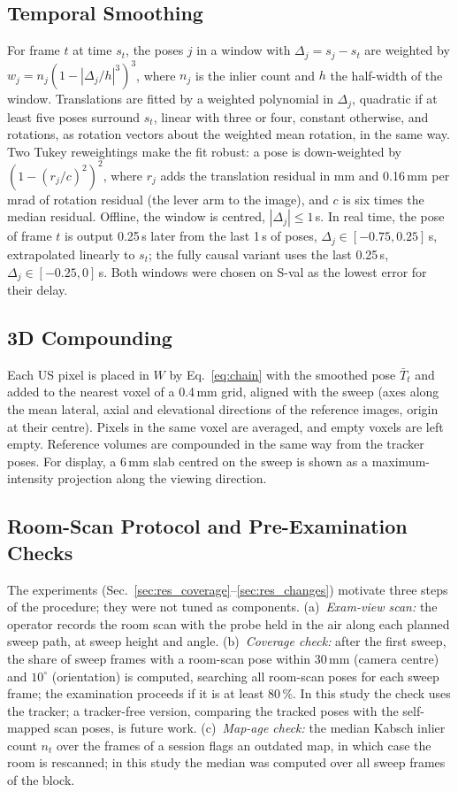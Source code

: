 \documentclass[9pt,shortpaper,twoside,web]{ieeecolor2}
\newcommand{\Sval}{S-val}
\begin{document}
\subsection{Temporal Smoothing}
\label{sec:smoothing}
For frame $t$ at time $s_t$, the poses $j$ in a window with $\Delta_j=s_j-s_t$ are weighted by $w_j=n_j(1-|\Delta_j/h|^3)^3$, where $n_j$ is the inlier count and $h$ the half-width of the window. Translations are fitted by a weighted polynomial in $\Delta_j$, quadratic if at least five poses surround $s_t$, linear with three or four, constant otherwise, and rotations, as rotation vectors about the weighted mean rotation, in the same way. Two Tukey reweightings make the fit robust: a pose is down-weighted by $(1-(r_j/c)^2)^2$, where $r_j$ adds the translation residual in mm and 0.16\,mm per mrad of rotation residual (the lever arm to the image), and $c$ is six times the median residual. Offline, the window is centred, $|\Delta_j|\le1$\,s. In real time, the pose of frame $t$ is output 0.25\,s later from the last 1\,s of poses, $\Delta_j\in[-0.75,0.25]$\,s, extrapolated linearly to $s_t$; the fully causal variant uses the last 0.25\,s, $\Delta_j\in[-0.25,0]$\,s. Both windows were chosen on \Sval{} as the lowest error for their delay.

\subsection{3D Compounding}
\label{sec:compounding}
Each US pixel is placed in $W$ by Eq.~\eqref{eq:chain} with the smoothed pose $\bar T_t$ and added to the nearest voxel of a 0.4\,mm grid, aligned with the sweep (axes along the mean lateral, axial and elevational directions of the reference images, origin at their centre). Pixels in the same voxel are averaged, and empty voxels are left empty. Reference volumes are compounded in the same way from the tracker poses. For display, a 6\,mm slab centred on the sweep is shown as a maximum-intensity projection along the viewing direction.

\subsection{Room-Scan Protocol and Pre-Examination Checks}
\label{sec:protocol}
The experiments (Sec.~\ref{sec:res_coverage}--\ref{sec:res_changes}) motivate three steps of the procedure; they were not tuned as components. (a)~\emph{Exam-view scan:} the operator records the room scan with the probe held in the air along each planned sweep path, at sweep height and angle. (b)~\emph{Coverage check:} after the first sweep, the share of sweep frames with a room-scan pose within 30\,mm (camera centre) and $10^\circ$ (orientation) is computed, searching all room-scan poses for each sweep frame; the examination proceeds if it is at least 80\,\%. In this study the check uses the tracker; a tracker-free version, comparing the tracked poses with the self-mapped scan poses, is future work. (c)~\emph{Map-age check:} the median Kabsch inlier count $n_t$ over the frames of a session flags an outdated map, in which case the room is rescanned; in this study the median was computed over all sweep frames of the block.
\end{document}

